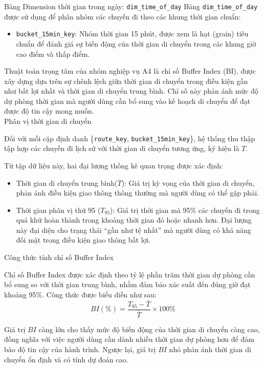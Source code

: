 Bảng Dimension thời gian trong ngày: \texttt{dim\_time\_of\_day}
Bảng \texttt{dim\_time\_of\_day} được sử dụng để phân nhóm các chuyến đi theo các khung thời gian chuẩn:
\begin{itemize}
    \item \texttt{bucket\_15min\_key}: Nhóm thời gian 15 phút, được xem là hạt (grain) tiêu chuẩn để đánh giá sự biến động của thời gian di chuyển trong các khung giờ cao điểm và thấp điểm.
\end{itemize}


Thuật toán trọng tâm của nhóm nghiệp vụ A4 là chỉ số Buffer Index (BI), được xây dựng dựa trên sự chênh lệch giữa thời gian di chuyển trong điều kiện gần như bất lợi nhất và thời gian di chuyển trung bình. Chỉ số này phản ánh mức độ dự phòng thời gian mà người dùng cần bổ sung vào kế hoạch di chuyển để đạt được độ tin cậy mong muốn.\\

Phân vị thời gian di chuyển

Đối với mỗi cặp định danh \{\texttt{route\_key}, \texttt{bucket\_15min\_key}\}, hệ thống thu thập tập hợp các chuyến đi lịch sử với thời gian di chuyển tương ứng, ký hiệu là $T$.

Từ tập dữ liệu này, hai đại lượng thống kê quan trọng được xác định:
\begin{itemize}
    \item Thời gian di chuyển trung bình($\bar{T}$): Giá trị kỳ vọng của thời gian di chuyển, phản ánh điều kiện giao thông thông thường mà người dùng có thể gặp phải.
    \item Thời gian phân vị thứ 95 ($T_{95}$): Giá trị thời gian mà 95\% các chuyến đi trong quá khứ hoàn thành trong khoảng thời gian đó hoặc nhanh hơn. Đại lượng này đại diện cho trạng thái ``gần như tệ nhất'' mà người dùng có khả năng đối mặt trong điều kiện giao thông bất lợi.
\end{itemize}

Công thức tính chỉ số Buffer Index

Chỉ số Buffer Index được xác định theo tỷ lệ phần trăm thời gian dự phòng cần bổ sung so với thời gian trung bình, nhằm đảm bảo xác suất đến đúng giờ đạt khoảng 95\%. Công thức được biểu diễn như sau:
\[
BI(\%) = \frac{T_{95} - \bar{T}}{\bar{T}} \times 100\%
\]

Giá trị $BI$ càng lớn cho thấy mức độ biến động của thời gian di chuyển càng cao, đồng nghĩa với việc người dùng cần dành nhiều thời gian dự phòng hơn để đảm bảo độ tin cậy của hành trình. Ngược lại, giá trị $BI$ nhỏ phản ánh thời gian di chuyển ổn định và có tính dự đoán cao.


